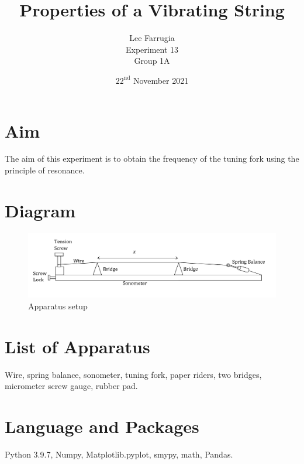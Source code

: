 \documentclass[12pt, a4paper]{article}
\title{Properties of a Vibrating String}
\author{Lee Farrugia \\ Experiment 13 \\ Group 1A}
\date{$22^{\text{nd}}$ November 2021}
\begin{document}
\maketitle

\section*{Aim}
The aim of this experiment is to obtain the frequency of the tuning fork using the principle of resonance.

\section*{Diagram}
\begin{figure}[H]
    \centering
    \includegraphics[scale=0.4]{Diagram.png}
    \caption{Apparatus setup}
    \label{fig:setup}
\end{figure}

\section*{List of Apparatus}
Wire, spring balance, sonometer, tuning fork, paper riders, two bridges, micrometer screw gauge, rubber pad.

\section*{Language and Packages}
Python 3.9.7, Numpy, Matplotlib.pyplot, smypy, math, Pandas. 
\end{document}

